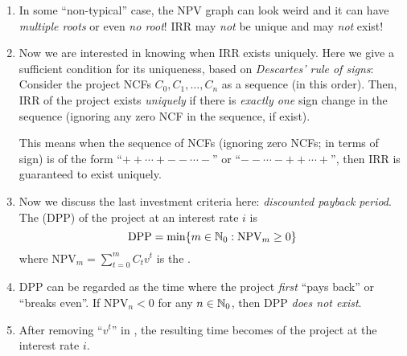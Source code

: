\begin{enumerate}
\item In some ``non-typical'' case, the NPV graph can look weird and it can
have \emph{multiple roots} or even \emph{no root}!  IRR may
\emph{not} be unique and may \emph{not} exist!
\begin{center}
\end{center}
\item \label{it:suff-cond-irr-unique}
Now we are interested in knowing when IRR exists uniquely. Here we give a
sufficient condition for its uniqueness, based on \emph{Descartes' rule of
signs}: Consider the project NCFs \(C_0,C_1,\dotsc,C_n\) as a sequence (in this
order).  Then, IRR of the project exists \emph{uniquely} if there is
\emph{exactly one} sign change in the sequence (ignoring any zero NCF in the
sequence, if exist).

\begin{note}
This means when the sequence of NCFs (ignoring zero NCFs; in terms of sign) is
of the form ``\(+ + \cdots + - - \cdots -\)'' or ``\(- - \cdots - + + \cdots
+\)'', then IRR is guaranteed to exist uniquely.
\end{note}
\item \label{it:dpp-def}
Now we discuss the last investment criteria here: \emph{discounted
payback period}. The  (DPP) of the project at
an interest rate \(i\) is
\[
\text{DPP}=\min\{m\in\mathbb{N}_0:\text{NPV}_{m}\ge 0\}
\]
where \(\displaystyle \text{NPV}_{m}=\sum_{t=0}^{m}C_tv^t\) is the .
\item DPP can be regarded as the time where the project \emph{first} ``pays
back'' or ``breaks even''. If \(\text{NPV}_{n}<0\) for any \(n\in\mathbb{N}_0\), then
DPP \emph{does not exist}.
\item After removing ``\(v^t\)'' in , the resulting time
becomes  of the project at the interest rate \(i\).
\end{enumerate}
